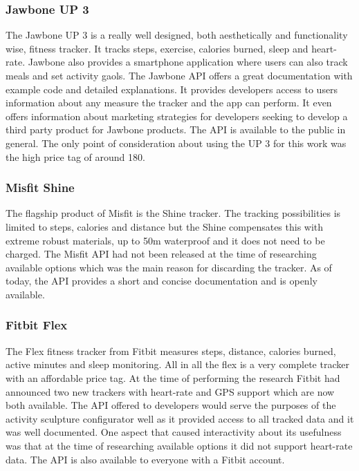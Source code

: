 \documentclass[../medieninformatik-arbeit.tex]{subfiles}
\begin{document}
\subsubsection*{Jawbone UP 3}
The Jawbone UP 3\cite{jawboneUpProduct} is a really well designed, both aesthetically and functionality wise, fitness tracker. It tracks steps, exercise, calories burned, sleep and heart-rate. Jawbone also provides a smartphone application where users can also track meals and set activity gaols. The Jawbone API\cite{jawboneUpApi} offers a great documentation with example code and detailed explanations. It provides developers access to users information about any measure the tracker and the app can perform. It even offers information about marketing strategies for developers seeking to develop a third party product for Jawbone products. The API is available to the public in general. The only point of consideration about using the UP 3 for this work was the high price tag of around \EUR{}180. 

\subsubsection*{Misfit Shine}
The flagship product of Misfit is the Shine tracker\cite{misfitShine}. The tracking possibilities is limited to steps, calories and distance but the Shine compensates this with extreme robust materials, up to 50m waterproof and it does not need to be charged. The Misfit API\cite{misfitApi} had not been released at the time of researching available options which was the main reason for discarding the tracker. As of today, the API provides a short and concise documentation and is openly available. 

\subsubsection*{Fitbit Flex}
The Flex fitness tracker from Fitbit\cite{fitbitProduct} measures steps, distance, calories burned, active minutes and sleep monitoring. All in all the flex is a very complete tracker with an affordable price tag. At the time of performing the research Fitbit had announced two new trackers with heart-rate and GPS support which are now both available. The API offered to developers\cite{fitbitApi} would serve the purposes of the activity sculpture configurator well as it provided access to all tracked data and it was well documented. One aspect that caused interactivity about its usefulness was that at the time of researching available options it did not support heart-rate data. The API is also available to everyone with a Fitbit account.
\end{document}
